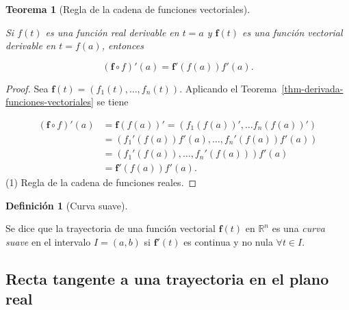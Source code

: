 \documentclass[
  a4paper,
]{scrreport}
\theoremstyle{definition}
\theoremstyle{plain}
\theoremstyle{definition}
\newtheorem{definition}{Definición}[chapter]
\theoremstyle{definition}
\theoremstyle{plain}
\newtheorem{theorem}{Teorema}[chapter]
\theoremstyle{plain}
\theoremstyle{remark}
\begin{document}
\begin{theorem}[Regla de la cadena de funciones
vectoriales]\protect\hypertarget{thm-regla-cadena-funciones-vectoriales}{}\label{thm-regla-cadena-funciones-vectoriales}

Si \(f(t)\) es una función real derivable en \(t=a\) y \(\mathbf{f}(t)\)
es una función vectorial derivable en \(t=f(a)\), entonces

\[
(\mathbf{f}\circ f)'(a) = \mathbf{f}'(f(a))f'(a).
\]

\end{theorem}

\begin{tcolorbox}[enhanced jigsaw, leftrule=.75mm, colbacktitle=quarto-callout-note-color!10!white, toprule=.15mm, opacityback=0, opacitybacktitle=0.6, toptitle=1mm, breakable, bottomtitle=1mm, colframe=quarto-callout-note-color-frame, rightrule=.15mm, titlerule=0mm, title=\textcolor{quarto-callout-note-color}{\faInfo}\hspace{0.5em}{Demostración}, arc=.35mm, left=2mm, bottomrule=.15mm, colback=white, coltitle=black]

\begin{proof}
Sea \(\mathbf{f}(t) = (f_1(t),\ldots,f_n(t))\). Aplicando el
Teorema~\ref{thm-derivada-funciones-vectoriales} se tiene

\begin{align*}
(\mathbf{f}\circ f)'(a) 
&= \mathbf{f}(f(a))' 
= (f_1(f(a))', \ldots f_n(f(a))') \\
&= (f_1'(f(a))f'(a), \ldots, f_n'(f(a))f'(a))\tag{1}\\
&= (f_1'(f(a)), \ldots, f_n'(f(a)))f'(a)\\
&= \mathbf{f}'(f(a))f'(a).
\end{align*} (1) Regla de la cadena de funciones reales.
\end{proof}

\end{tcolorbox}

\begin{definition}[Curva
suave]\protect\hypertarget{def-curva-suave}{}\label{def-curva-suave}

Se dice que la trayectoria de una función vectorial \(\mathbf{f}(t)\) en
\(\mathbb{R}^n\) es una \emph{curva suave} en el intervalo \(I=(a,b)\)
si \(\mathbf{f}'(t)\) es continua y no nula \(\forall t\in I\).

\end{definition}

\subsection{Recta tangente a una trayectoria en el plano
real}\label{recta-tangente-a-una-trayectoria-en-el-plano-real}
\end{document}
